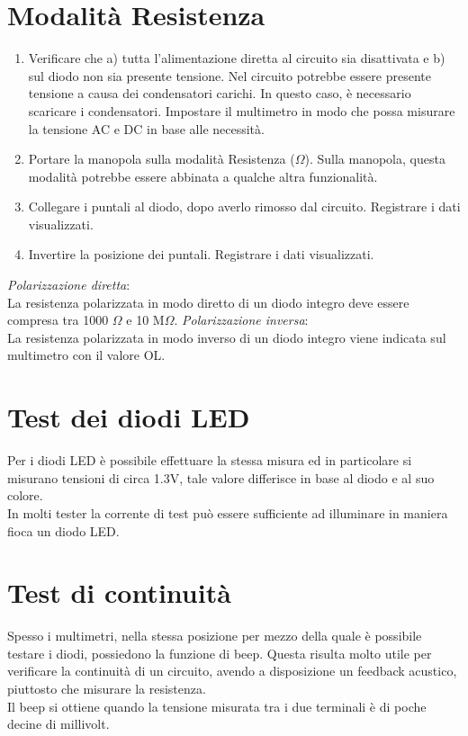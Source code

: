 \documentclass[12pt, letterpaper]{book}
\begin{document}
\section{Modalità Resistenza}
\begin{enumerate}
    \item Verificare che a) tutta l'alimentazione diretta al circuito sia disattivata e b) sul diodo non sia presente tensione. Nel circuito potrebbe essere presente tensione a causa dei condensatori carichi. In questo caso, è necessario scaricare i condensatori. Impostare il multimetro in modo che possa misurare la tensione AC e DC in base alle necessità.
    \item Portare la manopola sulla modalità Resistenza ($\Omega$). Sulla manopola, questa modalità potrebbe essere abbinata a qualche altra funzionalità.
    \item Collegare i puntali al diodo, dopo averlo rimosso dal circuito. Registrare i dati visualizzati.
    \item Invertire la posizione dei puntali. Registrare i dati visualizzati.
\end{enumerate}
\textit{Polarizzazione diretta}:\\
La resistenza polarizzata in modo diretto di un diodo integro deve essere compresa tra 1000 $\Omega$ e 10 M$\Omega$.
\textit{Polarizzazione inversa}:\\
La resistenza polarizzata in modo inverso di un diodo integro viene indicata sul multimetro con il valore OL.

\section{Test dei diodi LED}
Per i diodi LED è possibile effettuare la stessa misura ed in particolare si misurano tensioni di circa 1.3V, tale valore differisce in base al diodo e al suo colore.\\
In molti tester la corrente di test può essere sufficiente ad illuminare in maniera fioca un diodo LED.

\section{Test di continuità}
Spesso i multimetri, nella stessa posizione per mezzo della quale è possibile testare i diodi, possiedono la funzione di beep. Questa risulta molto utile per verificare la continuità di un circuito, avendo a disposizione un feedback acustico, piuttosto che misurare la resistenza.\\
Il beep si ottiene quando la tensione misurata tra i due terminali è di poche decine di millivolt.
\end{document}
